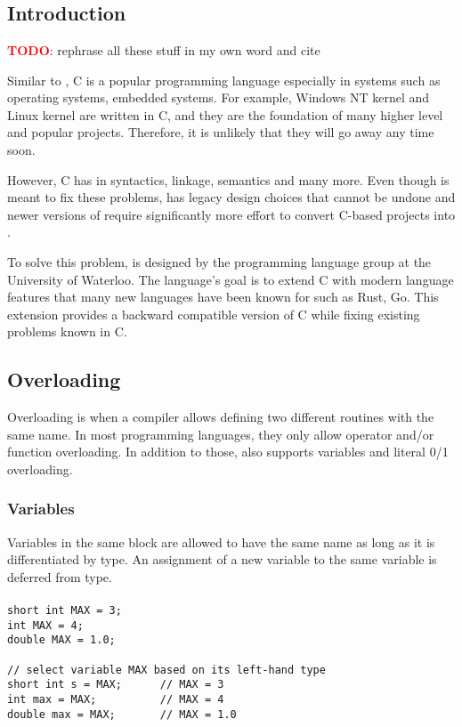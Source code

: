 \chapter{\CFA} \label{CFA}
\section{Introduction}
\textbf{\textcolor{red}{TODO}}: rephrase all these stuff in my own word and cite

Similar to \CC, C is a popular programming language especially in systems such
as operating systems, embedded systems. For example, Windows NT kernel and
Linux kernel are written in C, and they are the foundation of many higher level
and popular projects. Therefore, it is unlikely that they will go away any time soon.

However, C has in syntactics, linkage, semantics and many
more. Even though \CCS is meant to fix these problems, \CCS has legacy design
choices that cannot be undone and newer versions of \CCS require significantly
more effort to convert C-based projects into \CCS.

To solve this problem, \CFAS is designed by the programming language group at the
University of Waterloo. The language's goal is to extend C with modern language
features that many new languages have been known for such as Rust, Go. This
extension provides a backward compatible version of C while fixing existing
problems known in C.

\section{Overloading}
Overloading is when a compiler allows defining two different routines with
the same name. In most programming languages, they only allow operator and/or function overloading.
In addition to those, \CFAS also supports variables and literal 0/1 overloading.

\subsection{Variables}
Variables in the same block are allowed to have the same name as long as it is
differentiated by type. An assignment of a new variable to the same variable is
deferred from type.
\begin{frame}
\frametitle{}
\begin{lstlisting}
short int MAX = 3;
int MAX = 4;
double MAX = 1.0;

// select variable MAX based on its left-hand type
short int s = MAX;      // MAX = 3
int max = MAX;          // MAX = 4
double max = MAX;       // MAX = 1.0
\end{lstlisting}
\end{frame}

